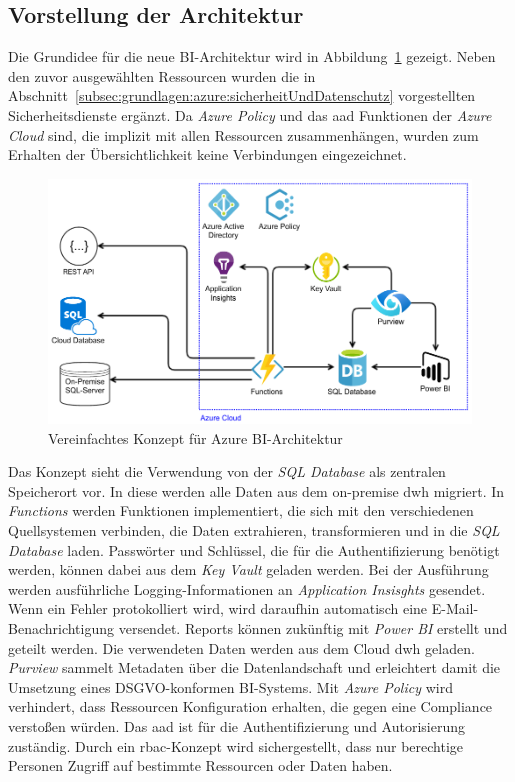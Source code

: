 \subsection{Vorstellung der Architektur}
Die Grundidee für die neue BI-Architektur wird in Abbildung~\ref{fig:chap03_4_konzeptArchitektur_offen} gezeigt. Neben den zuvor ausgewählten Ressourcen wurden die in Abschnitt~\ref{subsec:grundlagen:azure:sicherheitUndDatenschutz} vorgestellten Sicherheitsdienste ergänzt. Da \textit{Azure Policy} und das \ac{aad} Funktionen der \textit{Azure Cloud} sind, die implizit mit allen Ressourcen zusammenhängen, wurden zum Erhalten der Übersichtlichkeit keine Verbindungen eingezeichnet.

\begin{figure}[htbp]
 \centering
 \includegraphics[width=\textwidth]{gfx/azure/konzept.pdf}
 \caption{Vereinfachtes Konzept für Azure BI-Architektur}
\label{fig:chap03_4_konzeptArchitektur_offen}
\end{figure}

Das Konzept sieht die Verwendung von der \textit{SQL Database} als zentralen Speicherort vor. In diese werden alle Daten aus dem on-premise \ac{dwh} migriert. In \textit{Functions} werden Funktionen implementiert, die sich mit den verschiedenen Quellsystemen verbinden, die Daten extrahieren, transformieren und in die \textit{SQL Database} laden. Passwörter und Schlüssel, die für die Authentifizierung benötigt werden, können dabei aus dem \textit{Key Vault} geladen werden. Bei der Ausführung werden ausführliche Logging-Informationen an \textit{Application Insisghts} gesendet. Wenn ein Fehler protokolliert wird, wird daraufhin automatisch eine E-Mail-Benachrichtigung versendet. Reports können zukünftig mit \textit{Power BI} erstellt und geteilt werden. Die verwendeten Daten werden aus dem Cloud \ac{dwh} geladen. \textit{Purview} sammelt Metadaten über die Datenlandschaft und erleichtert damit die Umsetzung eines DSGVO-konformen BI-Systems. Mit \textit{Azure Policy} wird verhindert, dass Ressourcen Konfiguration erhalten, die gegen eine Compliance verstoßen würden. Das \ac{aad} ist für die Authentifizierung und Autorisierung zuständig. Durch ein \ac{rbac}-Konzept wird sichergestellt, dass nur berechtige Personen Zugriff auf bestimmte Ressourcen oder Daten haben. 

